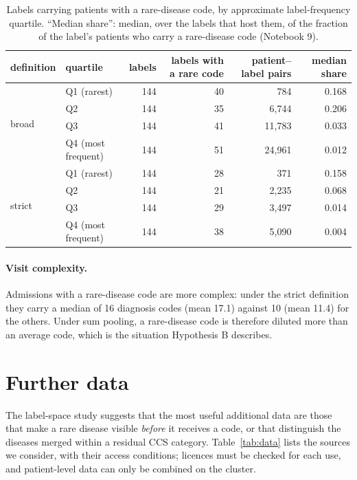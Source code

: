 \documentclass[11pt]{article}
\begin{document}
\begin{table}[H]
\centering\small
\begin{tabular}{llrrrr}
\toprule
definition & quartile & labels & labels with a rare code & patient--label pairs & median share\\
\midrule
\multirow{4}{*}{broad} & Q1 (rarest) & 144 & 40 & 784 & 0.168\\
 & Q2 & 144 & 35 & 6,744 & 0.206\\
 & Q3 & 144 & 41 & 11,783 & 0.033\\
 & Q4 (most frequent) & 144 & 51 & 24,961 & 0.012\\
\midrule
\multirow{4}{*}{strict} & Q1 (rarest) & 144 & 28 & 371 & 0.158\\
 & Q2 & 144 & 21 & 2,235 & 0.068\\
 & Q3 & 144 & 29 & 3,497 & 0.014\\
 & Q4 (most frequent) & 144 & 38 & 5,090 & 0.004\\
\bottomrule
\end{tabular}
\caption{Labels carrying patients with a rare-disease code, by approximate label-frequency quartile. ``Median
share'': median, over the labels that host them, of the fraction of the label's patients who carry a rare-disease
code (Notebook 9).}
\label{tab:rarecodes}
\end{table}

\paragraph{Visit complexity.} Admissions with a rare-disease code are more complex: under the strict definition
they carry a median of 16 diagnosis codes (mean 17.1) against 10 (mean 11.4) for the others. Under sum pooling,
a rare-disease code is therefore diluted more than an average code, which is the situation Hypothesis B
describes.


\section{Further data}\label{sec:data}

The label-space study suggests that the most useful additional data are those that make a rare disease visible
\emph{before} it receives a code, or that distinguish the diseases merged within a residual CCS category.
Table~\ref{tab:data} lists the sources we consider, with their access conditions; licences must be checked for
each use, and patient-level data can only be combined on the cluster.
\end{document}

